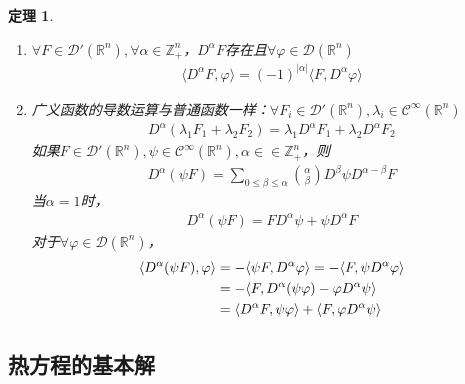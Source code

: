 \documentclass[11pt, a4paper]{article}
\theoremstyle{theorem}
\newtheorem{thm}{定理}[section]
\begin{document}
\begin{thm}

\begin{enumerate}
  \item $\forall F \in  \mathcal{D}'(\mathbb{R}^n), \forall \alpha \in \mathbb{Z}_+^n$，$D^\alpha F$存在且$\forall \varphi \in  \mathcal{D}(\mathbb{R}^n)$
  \begin{align}
      \langle D^\alpha F, \varphi \rangle = (-1)^{|\alpha|} \langle F, D^\alpha \varphi \rangle
  \end{align}
  \item 广义函数的导数运算与普通函数一样：$\forall F_i \in  \mathcal{D}'(\mathbb{R}^n), \lambda_i \in  \mathcal{C}^\infty(\mathbb{R}^n)$
  \begin{align}
      D^\alpha (\lambda_1 F_1 + \lambda_2 F_2) = \lambda_1 D^\alpha F_1 + \lambda_2 D^\alpha F_2
  \end{align}
  如果$F \in  \mathcal{D}'(\mathbb{R}^n), \psi \in \mathcal{C}^\infty(\mathbb{R}^n), \alpha \in \in \mathbb{Z}_+^n$，则
  \begin{align}
      D^\alpha(\psi F) = \sum_{0 \leq \beta \leq \alpha}  \binom{\alpha}{\beta} D^\beta \psi D^{\alpha - \beta} F
  \end{align}
  当$\alpha = 1$时，
  \begin{align}
      D^\alpha(\psi F) = F D^\alpha \psi + \psi D^{\alpha} F
  \end{align}
  对于$\forall \varphi \in \mathcal{D}(\mathbb{R}^n)$，
  \begin{align}
      \langle D^\alpha(\psi F), \varphi \rangle
      &= - \langle \psi F, D^\alpha \varphi \rangle
      = - \langle F, \psi D^\alpha \varphi \rangle \notag \\
      &= - \langle F, D^\alpha(\psi \varphi) - \varphi D^\alpha \psi \rangle \notag \\
      &= \langle D^\alpha F, \psi \varphi \rangle + \langle F, \varphi D^\alpha \psi \rangle
  \end{align}
\end{enumerate}
\end{thm}

\subsection{热方程的基本解}
\end{document}
